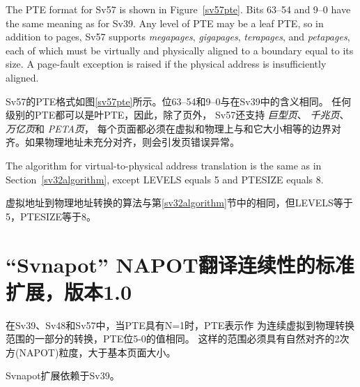 The PTE format for Sv57 is shown in Figure~\ref{sv57pte}.  Bits 63--54 and 9--0
have the same meaning as for Sv39.  Any level of PTE may be a leaf
PTE, so in addition to  pages, Sv57 supports
 {\em megapages},  {\em gigapages},
 {\em terapages}, and  {\em petapages},
each of which must be virtually and physically aligned to a boundary equal
to its size.  A page-fault exception is raised if the physical address is
insufficiently aligned.

Sv57的PTE格式如图\ref{sv57pte}所示。位63--54和9--0与在Sv39中的含义相同。
任何级别的PTE都可以是叶PTE，因此，除了页外，
Sv57还支持 {\em 巨型页}、 {\em 千兆页}、
 {\em 万亿页}和 {\em PETA页}，
每个页面都必须在虚拟和物理上与和它大小相等的边界对齐。如果物理地址未充分对齐，则会引发页错误异常。

The algorithm for virtual-to-physical address translation is the same
as in Section~\ref{sv32algorithm}, except LEVELS equals 5 and PTESIZE
equals 8.

虚拟地址到物理地址转换的算法与第\ref{sv32algorithm}节中的相同，但LEVELS等于5，PTESIZE等于8。

\chapter{``Svnapot'' NAPOT翻译连续性的标准扩展，版本1.0}
\label{svnapot}

在Sv39、Sv48和Sv57中，当PTE具有N=1时，PTE表示作
为连续虚拟到物理转换范围的一部分的转换，PTE位5-0的值相同。
这样的范围必须具有自然对齐的2次方(NAPOT)粒度，大于基本页面大小。

Svnapot扩展依赖于Sv39。


